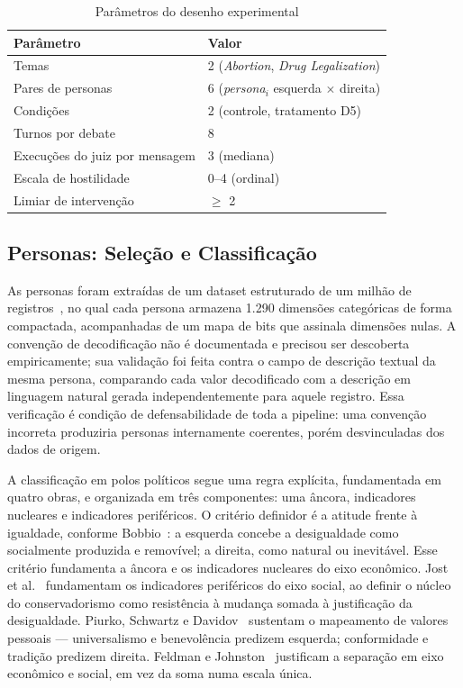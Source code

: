 \documentclass[conference]{IEEEtran} \IEEEoverridecommandlockouts %
\begin{document}
\begin{table}[htbp]
\caption{Parâmetros do desenho experimental}
\begin{center}
\begin{tabular}{@{}ll@{}}
\toprule
\textbf{Parâmetro} & \textbf{Valor} \\
\midrule
Temas & 2 (\textit{Abortion}, \textit{Drug Legalization}) \\
Pares de personas & 6 (\textit{persona}$_i$ esquerda $\times$ direita) \\
Condições & 2 (controle, tratamento D5) \\
Turnos por debate & 8 \\
Execuções do juiz por mensagem & 3 (mediana) \\
Escala de hostilidade & 0--4 (ordinal) \\
Limiar de intervenção & $\geq$ 2 \\
\bottomrule
\end{tabular}
\label{tab:desenho}
\end{center}
\end{table}

\subsection{Personas: Seleção e Classificação}

As personas foram extraídas de um dataset estruturado de um milhão de
registros~\cite{li2026matraix}, no qual cada persona armazena 1.290 dimensões
categóricas de forma compactada, acompanhadas de um mapa de bits que assinala
dimensões nulas. A convenção de decodificação não é documentada e precisou ser
descoberta empiricamente; sua validação foi feita contra o campo de descrição
textual da mesma persona, comparando cada valor decodificado com a descrição
em linguagem natural gerada independentemente para aquele registro. Essa
verificação é condição de defensabilidade de toda a pipeline: uma convenção
incorreta produziria personas internamente coerentes, porém desvinculadas dos
dados de origem.

A classificação em polos políticos segue uma regra explícita, fundamentada em
quatro obras, e organizada em três componentes: uma âncora, indicadores
nucleares e indicadores periféricos. O critério definidor é a atitude frente à
igualdade, conforme Bobbio~\cite{bobbio1995direita}: a esquerda concebe a
desigualdade como socialmente produzida e removível; a direita, como natural ou
inevitável. Esse critério fundamenta a âncora e os indicadores nucleares do
eixo econômico. Jost et al.~\cite{jost2003political} fundamentam os indicadores
periféricos do eixo social, ao definir o núcleo do conservadorismo como
resistência à mudança somada à justificação da desigualdade. Piurko, Schwartz e
Davidov~\cite{piurko2011basic} sustentam o mapeamento de valores pessoais —
universalismo e benevolência predizem esquerda; conformidade e tradição
predizem direita. Feldman e Johnston~\cite{feldman2014understanding} justificam
a separação em eixo econômico e social, em vez da soma numa escala única.
\end{document}
